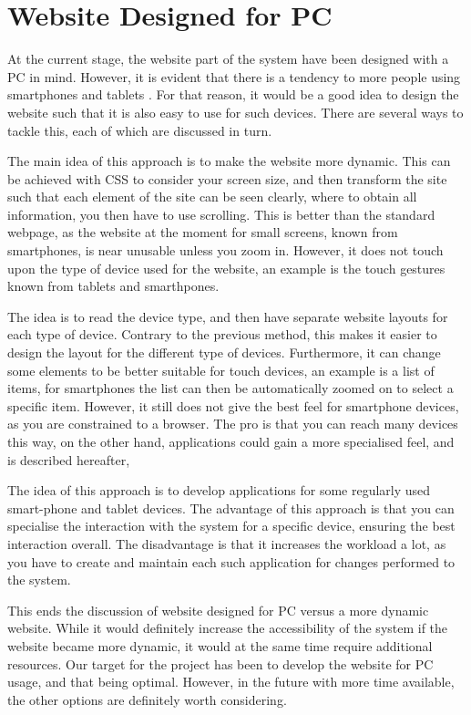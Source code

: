 \section*{Website Designed for PC}
At the current stage, the website part of the system have been designed with a PC in mind.
However, it is evident that there is a tendency to more people using smartphones and tablets \citep{article:smartphonetabletincrease}.
For that reason, it would be a good idea to design the website such that it is also easy to use for such devices.
There are several ways to tackle this, each of which are discussed in turn.
\begin{description}[style=nextline]
	\item[Dynamic scaling]
	The main idea of this approach is to make the website more dynamic. This can be achieved with CSS to consider your screen size, and then transform the site such that each element of the site can be seen clearly, where to obtain all information, you then have to use scrolling.
	This is better than the standard webpage, as the website at the moment for small screens, known from smartphones, is near unusable unless you zoom in.
	However, it does not touch upon the type of device used for the website, an example is the touch gestures known from tablets and smarthpones.
	\item[Detection of device type]
	The idea is to read the device type, and then have separate website layouts for each type of device. 
	Contrary to the previous method, this makes it easier to design the layout for the different type of devices.
	Furthermore, it can change some elements to be better suitable for touch devices, an example is a list of items, for smartphones the list can then be automatically zoomed on to select a specific item.
	However, it still does not give the best feel for smartphone devices, as you are constrained to a browser.
	The pro is that you can reach many devices this way, on the other hand, applications could gain a more specialised feel, and is described hereafter,
	\item[Separate Application]
	The idea of this approach is to develop applications for some regularly used smart-phone and tablet devices.
	The advantage of this approach is that you can specialise the interaction with the system for a specific device, ensuring the best interaction overall.
	The disadvantage is that it increases the workload a lot, as you have to create and maintain each such application for changes performed to the system.	
\end{description}
This ends the discussion of website designed for PC versus a more dynamic website.
While it would definitely increase the accessibility of the system if the website became more dynamic, it would at the same time require additional resources.
Our target for the project has been to develop the website for PC usage, and that being optimal.
However, in the future with more time available, the other options are definitely worth considering.

